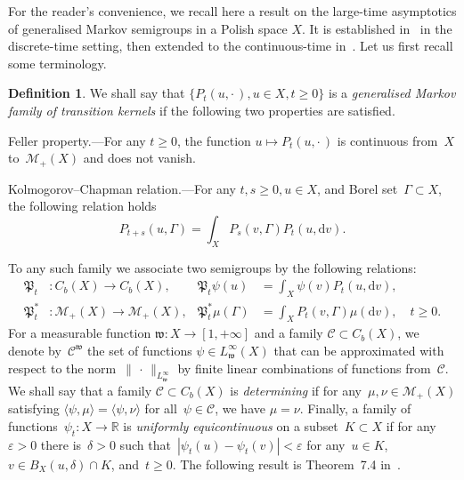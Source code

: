 \documentclass[10pt]{amsart}
\theoremstyle{definition}\newtheorem{defi}[theo]{Definition}\newtheorem{rema}[theo]{Remark}\newtheorem{exam}[theo]{Example}\newtheorem{exem}[theo]{Example}\newtheorem{nota}[theo]{Notation}
\newcommand{\R}{{\mathbb R}}
\newcommand{\CC}{{\mathcal C}}
\newcommand{\MM}{{\mathcal M}}
\newcommand{\wwww}{{\mathfrak w}}
\newcommand{\PPPP}{{\mathfrak P}}
\newcommand{\lag}{\langle}
\newcommand{\rag}{\rangle}
\newcommand{\dd}{\mathrm{d}}
\providecommand{\pointir}{.\enspace---\enspace}
\begin{document}
For the reader's convenience, we recall here a result on the large-time asymptotics of generalised Markov semigroups in a Polish space $X$. It is established in~\cite{JNPS-2014} in the discrete-time setting, then extended to the continuous-time in~\cite{MN-2015}. Let us first recall some terminology.

\begin{defi}\label{D:5.2}
We shall say that $\{P_t(u,{\cdot\,}),u\in X, t\ge0\} $ is a \emph{generalised Markov family of transition kernels} if the following two properties are satisfied.

Feller property\pointir For any $t\ge0$, the function $u\mapsto P_t(u,{\cdot\,})$ is continuous from~$X$ to~$\MM_+(X)$ and does not vanish.

Kolmogorov--Chapman relation\pointir For any $t,s\ge0, u\in X$, and Borel set~$\Gamma\subset X$, the following relation holds
\[
P_{t+s}(u,\Gamma)=\int_X P_s(v,\Gamma) P_t(u,\dd v).
\]
\end{defi}

To any such family we associate two semigroups by the following relations:
\begin{align*}
\PPPP_t&:C_b(X)\to C_b(X), & \PPPP_t \psi(u)&=\int_X \psi(v) P_t(u,\dd v),\\
\PPPP_t^*&:\MM_+(X)\to \MM_+(X), & \PPPP_t^* \mu(\Gamma)&=\int_X P_t(v,\Gamma) \mu(\dd v),\quad t\ge0.
\end{align*}
For a measurable function ${\wwww}:X\to[1,+\infty]$ and a family $\CC\subset C_b(X)$, we denote by~$\CC^\wwww$ the set of functions $\psi\in L_\wwww^\infty(X)$ that can be approximated with respect to the norm~$\|{\,\cdot\,}\|_{L_\wwww^\infty}$ by finite linear combinations of functions from~$\CC$. We shall say that a family $\CC\subset C_b(X)$ is \emph{determining} if for any~$\mu,\nu\in\MM_+(X)$ satisfying $\lag \psi,\mu\rag=\lag \psi,\nu\rag$ for all~$\psi\in\CC$, we have $\mu=\nu$. Finally, a family of functions~$\psi_t: X\to\R$ is \emph{uniformly equicontinuous} on a subset~$K\subset X$ if for any~$\varepsilon>0$ there is~$\delta>0$ such that~$|\psi_t(u)-\psi_t(v)|<\varepsilon$ for any~$u\in K$, $v\in B_X(u,\delta)\cap K$, and~$ t\ge0$. The following result is Theorem~7.4 in~\cite{MN-2015}.
\end{document}
